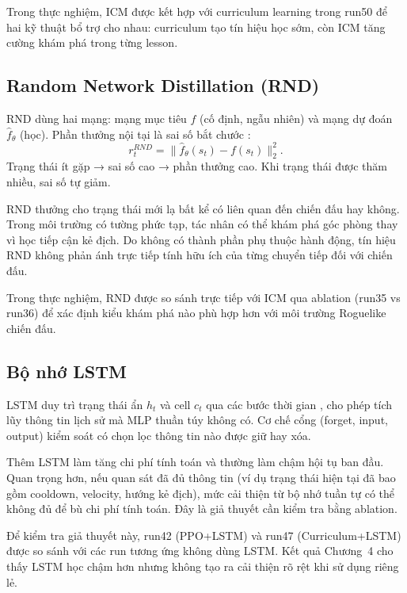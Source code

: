 Trong thực nghiệm, ICM được kết hợp với curriculum learning trong run50 để hai kỹ thuật bổ trợ cho nhau: curriculum tạo tín hiệu học sớm, còn ICM tăng cường khám phá trong từng lesson.

\subsection{Random Network Distillation (RND)}

RND dùng hai mạng: mạng mục tiêu $f$ (cố định, ngẫu nhiên) và mạng dự đoán $\hat{f}_\theta$ (học). Phần thưởng nội tại là sai số bắt chước \cite{Burda2018}:
\begin{equation}
    r_t^{RND} = \|\hat{f}_\theta(s_t) - f(s_t)\|_2^2.
\end{equation}
Trạng thái ít gặp → sai số cao → phần thưởng cao. Khi trạng thái được thăm nhiều, sai số tự giảm.

RND thưởng cho trạng thái mới lạ bất kể có liên quan đến chiến đấu hay không. Trong môi trường có tường phức tạp, tác nhân có thể khám phá góc phòng thay vì học tiếp cận kẻ địch. Do không có thành phần phụ thuộc hành động, tín hiệu RND không phản ánh trực tiếp tính hữu ích của từng chuyển tiếp đối với chiến đấu.

Trong thực nghiệm, RND được so sánh trực tiếp với ICM qua ablation (run35 vs run36) để xác định kiểu khám phá nào phù hợp hơn với môi trường Roguelike chiến đấu.

\subsection{Bộ nhớ LSTM}

LSTM duy trì trạng thái ẩn $h_t$ và cell $c_t$ qua các bước thời gian \cite{Hochreiter1997}, cho phép tích lũy thông tin lịch sử mà MLP thuần túy không có. Cơ chế cổng (forget, input, output) kiểm soát có chọn lọc thông tin nào được giữ hay xóa.

Thêm LSTM làm tăng chi phí tính toán và thường làm chậm hội tụ ban đầu. Quan trọng hơn, nếu quan sát đã đủ thông tin (ví dụ trạng thái hiện tại đã bao gồm cooldown, velocity, hướng kẻ địch), mức cải thiện từ bộ nhớ tuần tự có thể không đủ để bù chi phí tính toán. Đây là giả thuyết cần kiểm tra bằng ablation.

Để kiểm tra giả thuyết này, run42 (PPO+LSTM) và run47 (Curriculum+LSTM) được so sánh với các run tương ứng không dùng LSTM. Kết quả Chương~4 cho thấy LSTM học chậm hơn nhưng không tạo ra cải thiện rõ rệt khi sử dụng riêng lẻ.

